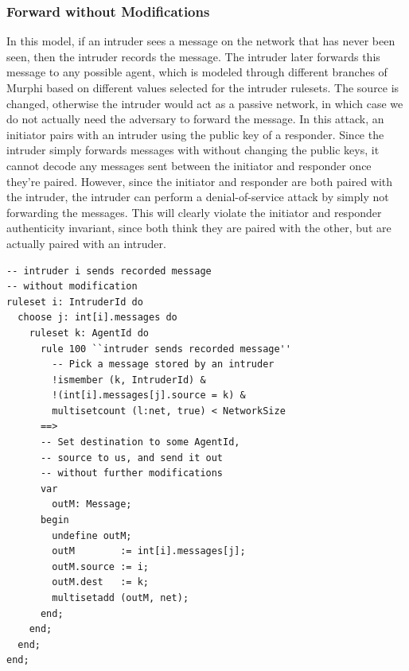 \documentclass{acm_proc_article-sp}
\begin{document}
\subsubsection{Forward without Modifications}
In this model, if an intruder sees a message on the network that has never been seen, then the intruder records the message. The intruder later forwards this message to any possible agent, which is modeled through different branches of Murphi based on different values selected for the intruder rulesets. The source is changed, otherwise the intruder would act as a passive network, in which case we do not actually need the adversary to forward the message. In this attack, an initiator pairs with an intruder using the public key of a responder. Since the intruder simply forwards messages with without changing the public keys, it cannot decode any messages sent between the initiator and responder once they're paired. However, since the initiator and responder are both paired with the intruder, the intruder can perform a denial-of-service attack by simply not forwarding the messages. This will clearly violate the initiator and responder authenticity invariant, since both think they are paired with the other, but are actually paired with an intruder.

\begin{verbatim}
-- intruder i sends recorded message
-- without modification
ruleset i: IntruderId do
  choose j: int[i].messages do
    ruleset k: AgentId do
      rule 100 ``intruder sends recorded message''
        -- Pick a message stored by an intruder
        !ismember (k, IntruderId) &
        !(int[i].messages[j].source = k) &
        multisetcount (l:net, true) < NetworkSize
      ==>
      -- Set destination to some AgentId,
      -- source to us, and send it out
      -- without further modifications
      var
        outM: Message;
      begin
        undefine outM;
        outM        := int[i].messages[j];
        outM.source := i;
        outM.dest   := k;
        multisetadd (outM, net);
      end;
    end;
  end;
end;
\end{verbatim}
\end{document}
